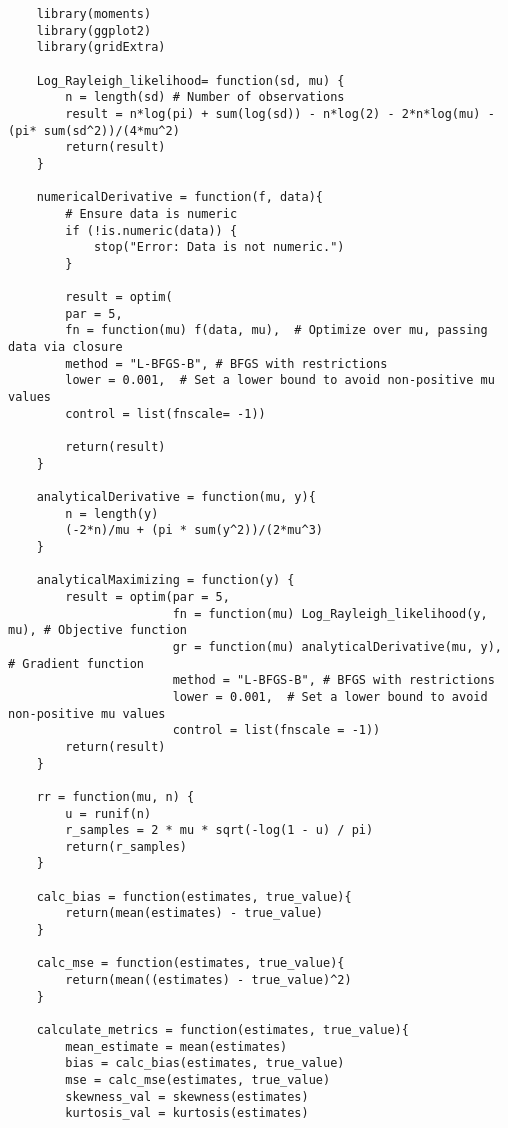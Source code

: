 \documentclass{report}
\begin{document}
\begin{verbatim}
    library(moments)
    library(ggplot2)
    library(gridExtra)
    
    Log_Rayleigh_likelihood= function(sd, mu) {
        n = length(sd) # Number of observations
        result = n*log(pi) + sum(log(sd)) - n*log(2) - 2*n*log(mu) - (pi* sum(sd^2))/(4*mu^2) 
        return(result)
    }
    
    numericalDerivative = function(f, data){
        # Ensure data is numeric
        if (!is.numeric(data)) {
            stop("Error: Data is not numeric.")
        }
    
        result = optim(
        par = 5,
        fn = function(mu) f(data, mu),  # Optimize over mu, passing data via closure 
        method = "L-BFGS-B", # BFGS with restrictions
        lower = 0.001,  # Set a lower bound to avoid non-positive mu values
        control = list(fnscale= -1))
        
        return(result)
    }
    
    analyticalDerivative = function(mu, y){
        n = length(y)
        (-2*n)/mu + (pi * sum(y^2))/(2*mu^3)
    }
    
    analyticalMaximizing = function(y) {
        result = optim(par = 5, 
                       fn = function(mu) Log_Rayleigh_likelihood(y, mu), # Objective function
                       gr = function(mu) analyticalDerivative(mu, y),    # Gradient function
                       method = "L-BFGS-B", # BFGS with restrictions
                       lower = 0.001,  # Set a lower bound to avoid non-positive mu values
                       control = list(fnscale = -1))
        return(result)
    }
    
    rr = function(mu, n) {
        u = runif(n)
        r_samples = 2 * mu * sqrt(-log(1 - u) / pi)
        return(r_samples)
    }
    
    calc_bias = function(estimates, true_value){
        return(mean(estimates) - true_value)
    }
    
    calc_mse = function(estimates, true_value){
        return(mean((estimates) - true_value)^2)
    }
    
    calculate_metrics = function(estimates, true_value){
        mean_estimate = mean(estimates)
        bias = calc_bias(estimates, true_value)
        mse = calc_mse(estimates, true_value)
        skewness_val = skewness(estimates)
        kurtosis_val = kurtosis(estimates) 
    

\end{verbatim}
\end{document}
